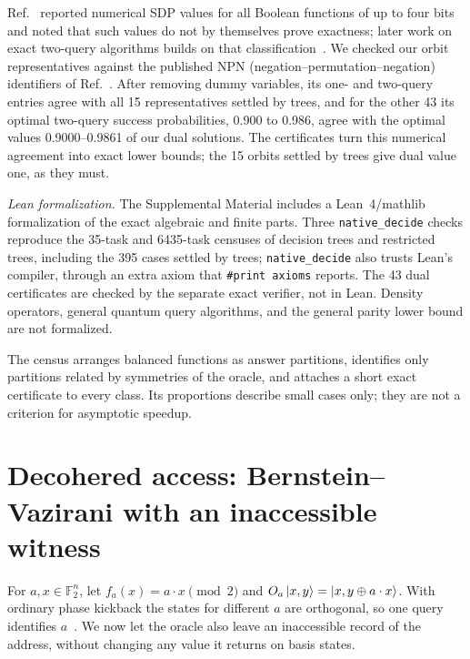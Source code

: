 \documentclass[
  aps,
  pra,
  reprint,
  nofootinbib
]{revtex4-2}
\begin{document}
Ref.~\cite{MontanaroJozsaMitchison2015} reported numerical SDP values for all
Boolean functions of up to four bits and noted that such values do not by
themselves prove exactness; later work on exact two-query algorithms builds on
that classification~\cite{YeYangHuang2024}. We checked our orbit
representatives against the published NPN (negation--permutation--negation)
identifiers of Ref.~\cite{MontanaroJozsaMitchison2015}. After removing dummy
variables, its one- and two-query entries agree with all 15 representatives
settled by trees, and for the other 43 its optimal two-query success
probabilities, 0.900 to 0.986, agree with the optimal values 0.9000--0.9861 of
our dual solutions. The certificates turn this numerical agreement into exact
lower bounds; the 15 orbits settled by trees give dual value one, as they
must.

\emph{Lean formalization.} The Supplemental Material includes a
Lean~4/mathlib formalization of the exact algebraic and finite parts. Three
\texttt{native\_decide} checks reproduce the 35-task and 6435-task censuses of
decision trees and restricted trees, including the 395 cases settled by trees;
\texttt{native\_decide} also trusts Lean's compiler, through an extra axiom
that \texttt{\#print axioms} reports. The 43 dual certificates are checked by
the separate exact verifier, not in Lean. Density operators, general quantum
query algorithms, and the general parity lower bound are not formalized.

The census arranges balanced functions as answer partitions, identifies only
partitions related by symmetries of the oracle, and attaches a short exact
certificate to every class. Its proportions describe small cases only; they
are not a criterion for asymptotic speedup.

\section{Decohered access: Bernstein--Vazirani with an inaccessible witness}
\label{sec:witness}

For \(a,x\in\mathbb F_2^n\), let \(f_a(x)=a\cdot x \pmod2\) and
\(O_a\ket{x,y}=\ket{x,y\oplus a\cdot x}\). With ordinary phase kickback the
states for different \(a\) are orthogonal, so one query identifies
\(a\)~\cite{be-va}. We now let the oracle also leave an inaccessible record of
the address, without changing any value it returns on basis states.
\end{document}
